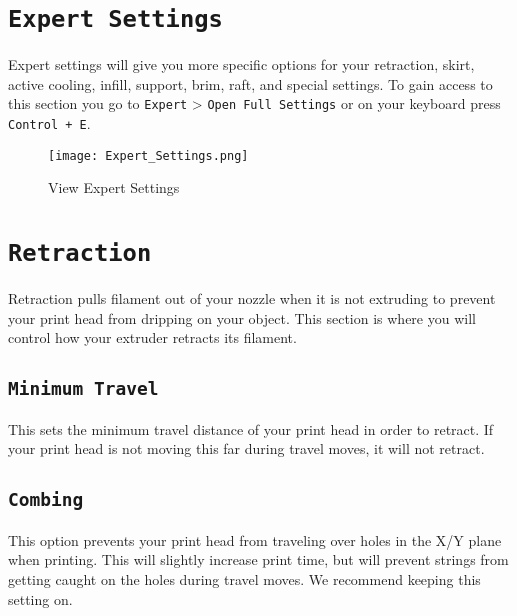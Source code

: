 
\section{\texttt{Expert Settings}}
Expert settings will give you more specific options for your retraction, skirt, active cooling, infill, support, brim, raft, and special settings. To gain access to this section you go to \texttt{Expert} > \texttt{Open Full Settings} or on your keyboard press \texttt{Control + E}.
\begin{figure}[H]
\centering
\texttt{[image: Expert\_Settings.png]}
\caption{View Expert Settings}
\label{fig:Expert Settings}
\end{figure}

\section{\texttt{Retraction}}
Retraction pulls filament out of your nozzle when it is not extruding to prevent your print head from dripping on your object. This section is where you will control how your extruder retracts its filament.

\subsection{\texttt{Minimum Travel}}
This sets the minimum travel distance of your print head in order to retract. If your print head is not moving this far during travel moves, it will not retract.

\subsection{\texttt{Combing}}
This option prevents your print head from traveling over holes in the X/Y plane when printing. This will slightly increase print time, but will prevent strings from getting caught on the holes during travel moves. We recommend keeping this setting on.

